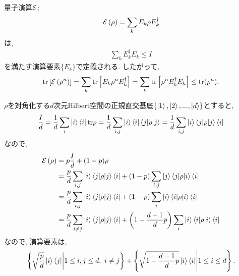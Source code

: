 \begin{ex}
    \label{ex8.18}
    量子演算$\mathcal{E}$;
    \begin{align*}
        \mathcal{E} \left( \rho \right)
        = \sum_k E_k \rho E_k^\dagger
    \end{align*}
    は,
    \begin{align*}
        \sum_k E_k^\dagger E_k \le I
    \end{align*}
    を満たす演算要素$\{ E_k\}$で定義される. したがって,
    \begin{align*}
        \mathrm{tr} \left[ \mathcal{E} \left( \rho^{n} \right)\right]
        =
        \sum_k  \mathrm{tr} \left[ E_k \rho^n E_k^\dagger \right]
        =
        \sum_k  \mathrm{tr} \left[\rho^n E_k^\dagger E_k \right]
        \le \mathrm{tr}(\rho^n) .
    \end{align*}
\end{ex}
\begin{ex}
    \label{ex8.19}
    $\rho$を対角化する$d$次元Hilbert空間の正規直交基底$\{ \ket{1}, \ket{2}, ... , \ket{d}\}$とすると,
    \begin{align*}
        \frac{I}{d}
        =
        \frac{1}{d} \sum_i \ket{i}\bra{i} \mathrm{tr}\rho
        =
        \frac{1}{d} \sum_{i,j} \ket{i}\bra{i} \braket{j | \rho | j}
        =
        \frac{1}{d} \sum_{i,j} \ket{i}\braket{j | \rho | j}\bra{i}
    \end{align*}
    なので,
    \begin{align*}
        \mathcal{E} \left( \rho\right)
         & =
        p \frac{I}{d} + (1-p) \rho                           \\
         & =
        \frac{p}{d} \sum_{i,j} \ket{i}\braket{j | \rho | j}\bra{i}
        +
        (1-p) \sum_{i,j} \ket{j}\braket{j | \rho | i}\bra{i} \\
         & =
        \frac{p}{d} \sum_{i,j} \ket{i}\braket{j | \rho | j}\bra{i}
        +
        (1-p) \sum_{i} \ket{i}\braket{i | \rho | i}\bra{i}   \\
         & =
        \frac{p}{d} \sum_{i \neq j} \ket{i}\braket{j | \rho | j}\bra{i}
        +
        \left( 1 - \frac{d-1}{d}p\right) \sum_{i} \ket{i}\braket{i | \rho | i}\bra{i}
    \end{align*}
    なので, 演算要素は,
    \begin{align*}
        \left\{ \sqrt{\frac{p}{d} }\ket{i} \bra{j} \middle| 1 \le i, j \le d, \ i \neq j\right\}
        +
        \left\{
        \sqrt{ 1 - \frac{d-1}{d}p} \ket{i}\bra{i} \middle| 1 \le i \le d
        \right\}.
    \end{align*}
\end{ex}

